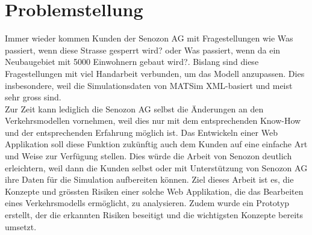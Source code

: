 \chapter{Problemstellung}
Immer wieder kommen Kunden der Senozon AG mit Fragestellungen wie \glqq{}Was passiert, wenn diese Strasse gesperrt wird?\grqq{} oder \glqq{}Was passiert, wenn da ein Neubaugebiet mit 5000 Einwohnern gebaut wird?\grqq{}. Bislang sind diese Fragestellungen mit viel Handarbeit verbunden, um das Modell anzupassen. Dies insbesondere, weil die Simulationsdaten von MATSim XML-basiert und meist sehr gross sind.\\
Zur Zeit kann lediglich die Senozon AG selbst die Änderungen an den Verkehrsmodellen vornehmen, weil dies nur mit dem entsprechenden Know-How und der entsprechenden Erfahrung möglich ist. Das Entwickeln einer Web Applikation soll diese Funktion zukünftig auch dem Kunden auf eine einfache Art und Weise zur Verfügung stellen. Dies würde die Arbeit von Senozon deutlich erleichtern, weil dann die Kunden selbst oder mit Unterstützung von Senozon AG ihre Daten für die Simulation aufbereiten können. Ziel dieses Arbeit ist es, die Konzepte und grössten Risiken einer solche Web Applikation, die das Bearbeiten eines Verkehrsmodells ermöglicht, zu analysieren. Zudem wurde ein Prototyp erstellt, der die erkannten Risiken beseitigt und die wichtigsten Konzepte bereits umsetzt.\\
